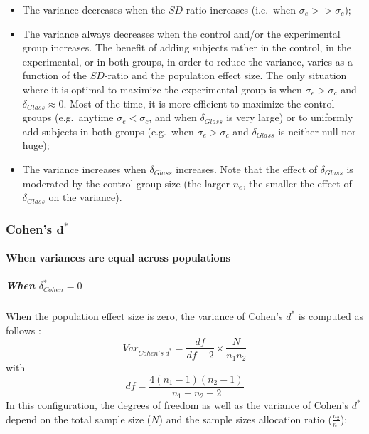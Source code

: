 \documentclass[
  english,
  man,mask,floatsintext]{apa6}
\providecommand{\tightlist}{%
  \setlength{\itemsep}{0pt}\setlength{\parskip}{0pt}}
\let\oldparagraph\paragraph
\renewcommand{\paragraph}[1]{\oldparagraph{#1}\mbox{}}
\let\oldsubparagraph\subparagraph
\renewcommand{\subparagraph}[1]{\oldsubparagraph{#1}\mbox{}}
\begin{document}
\begin{itemize}
\tightlist
\item
  The variance decreases when the \(SD\)-ratio increases (i.e.~when \(\sigma_e >> \sigma_c\));\\
\item
  The variance always decreases when the control and/or the experimental group increases. The benefit of adding subjects rather in the control, in the experimental, or in both groups, in order to reduce the variance, varies as a function of the \(SD\)-ratio and the population effect size. The only situation where it is optimal to maximize the experimental group is when \(\sigma_e > \sigma_c\) and \(\delta_{Glass} \approx 0\). Most of the time, it is more efficient to maximize the control groups (e.g.~anytime \(\sigma_e < \sigma_c\), and when \(\delta_{Glass}\) is very large) or to uniformly add subjects in both groups (e.g.~when \(\sigma_e > \sigma_c\) and \(\delta_{Glass}\) is neither null nor huge);
\item
  The variance increases when \(\delta_{Glass}\) increases. Note that the effect of \(\delta_{Glass}\) is moderated by the control group size (the larger \(n_e\), the smaller the effect of \(\delta_{Glass}\) on the variance).
\end{itemize}

\newpage

\hypertarget{cohens-bmd-1}{%
\subsubsection{\texorpdfstring{Cohen's \(\bm{d^*}\)}{Cohen's \textbackslash bm\{d\^{}*\}}}\label{cohens-bmd-1}}

\hypertarget{when-variances-are-equal-across-populations-4}{%
\paragraph{When variances are equal across populations}\label{when-variances-are-equal-across-populations-4}}

\hypertarget{when-delta_cohen-0}{%
\subparagraph{\texorpdfstring{When \(\delta^*_{Cohen} = 0\)}{When \textbackslash delta\^{}*\_\{Cohen\} = 0}}\label{when-delta_cohen-0}}

When the population effect size is zero, the variance of Cohen's \(d^*\) is computed as follows :
\[Var_{Cohen's \; d^*} = \frac{df}{df-2} \times \frac{N}{n_1n_2}\]
with \[df = \frac{4(n_1-1)(n_2-1)}{n_1+n_2-2}\]
In this configuration, the degrees of freedom as well as the variance of Cohen's \(d^*\) depend on the total sample size (\(N\)) and the sample sizes allocation ratio (\(\frac{n_2}{n_1}\)):
\end{document}
